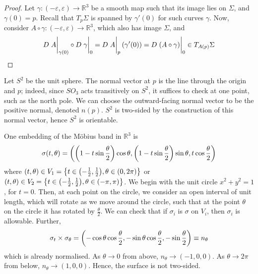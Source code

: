 \begin{proof}
	Let \( \gamma \colon (-\varepsilon, \varepsilon) \to \mathbb R^3 \) be a smooth map such that its image lies on \( \Sigma \), and \( \gamma(0) = p \).
	Recall that \( T_p \Sigma \) is spanned by \( \gamma'(0) \) for such curves \( \gamma \).
	Now, consider \( A \circ \gamma \colon (-\varepsilon, \varepsilon) \to \mathbb R^3 \), which also has image \( \Sigma \), and
	\[ D \eval{A}_{\gamma(0)} \circ D \eval{\gamma}_0 = D \eval{A}_p \qty(\gamma'(0)) = D \eval{(A \circ \gamma)}_0 \in T_{A(p)} \Sigma \]
\end{proof}
\begin{example}
	Let \( S^2 \) be the unit sphere.
	The normal vector at \( p \) is the line through the origin and \( p \); indeed, since \( SO_3 \) acts transitively on \( S^2 \), it suffices to check at one point, such as the north pole.
	We can choose the outward-facing normal vector to be the positive normal, denoted \( n(p) \).
	\( S^2 \) is two-sided by the construction of this normal vector, hence \( S^2 \) is orientable.
\end{example}
\begin{example}
	One embedding of the M\"obius band in \( \mathbb R^3 \) is
	\[ \sigma(t,\theta) = \qty(\qty(1 - t \sin \frac{\theta}{2})\cos \theta, \qty(1 - t \sin \frac{\theta}{2})\sin \theta, t \cos \frac{\theta}{2}) \]
	where \( (t,\theta) \in V_1 = \qty{t \in \qty(-\frac{1}{2}, \frac{1}{2}), \theta \in (0,2\pi)} \) or \( (t,\theta) \in V_2 = \qty{t \in \qty(-\frac{1}{2}, \frac{1}{2}), \theta \in (-\pi, \pi)} \).
	We begin with the unit circle \( x^2 + y^2 = 1 \), for \( t = 0 \).
	Then, at each point on the circle, we consider an open interval of unit length, which will rotate as we move around the circle, such that at the point \( \theta \) on the circle it has rotated by \( \frac{\theta}{2} \).
	We can check that if \( \sigma_i \) is \( \sigma \) on \( V_i \), then \( \sigma_i \) is allowable.
	Further,
	\[ \sigma_t \times \sigma_\theta = \qty(-\cos\theta \cos\frac{\theta}{2}, -\sin\theta \cos\frac{\theta}{2}, -\sin\frac{\theta}{2}) \equiv n_\theta \]
	which is already normalised.
	As \( \theta \to 0 \) from above, \( n_\theta \to (-1,0,0) \).
	As \( \theta \to 2\pi \) from below, \( n_\theta \to (1,0,0) \).
	Hence, the surface is not two-sided.
\end{example}
